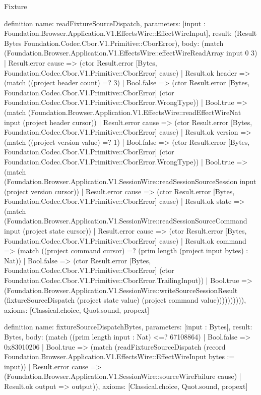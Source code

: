\begin{lexlean}{Fixture}
\begin{semanticmodule}
definition{
  name: readFixtureSourceDispatch,
  parameters: [input : Foundation.Browser.Application.V1.EffectsWire::EffectWireInput],
  result: (Result Bytes Foundation.Codec.Cbor.V1.Primitive::CborError),
  body: (match (Foundation.Browser.Application.V1.EffectsWire::effectWireReadArray input 0 3)
    | Result.error cause => (ctor Result.error [Bytes, Foundation.Codec.Cbor.V1.Primitive::CborError] cause)
    | Result.ok header => (match ((project header count) =? 3)
      | Bool.false => (ctor Result.error [Bytes, Foundation.Codec.Cbor.V1.Primitive::CborError] (ctor Foundation.Codec.Cbor.V1.Primitive::CborError.WrongType))
      | Bool.true => (match (Foundation.Browser.Application.V1.EffectsWire::readEffectWireNat input (project header cursor))
        | Result.error cause => (ctor Result.error [Bytes, Foundation.Codec.Cbor.V1.Primitive::CborError] cause)
        | Result.ok version => (match ((project version value) =? 1)
          | Bool.false => (ctor Result.error [Bytes, Foundation.Codec.Cbor.V1.Primitive::CborError] (ctor Foundation.Codec.Cbor.V1.Primitive::CborError.WrongType))
          | Bool.true => (match (Foundation.Browser.Application.V1.SessionWire::readSessionSourceSession input (project version cursor))
            | Result.error cause => (ctor Result.error [Bytes, Foundation.Codec.Cbor.V1.Primitive::CborError] cause)
            | Result.ok state => (match (Foundation.Browser.Application.V1.SessionWire::readSessionSourceCommand input (project state cursor))
              | Result.error cause => (ctor Result.error [Bytes, Foundation.Codec.Cbor.V1.Primitive::CborError] cause)
              | Result.ok command => (match ((project command cursor) =? (prim length (project input bytes) : Nat))
                | Bool.false => (ctor Result.error [Bytes, Foundation.Codec.Cbor.V1.Primitive::CborError] (ctor Foundation.Codec.Cbor.V1.Primitive::CborError.TrailingInput))
                | Bool.true => (Foundation.Browser.Application.V1.SessionWire::writeSourceSessionResult (fixtureSourceDispatch (project state value) (project command value)))))))))),
  axioms: [Classical.choice, Quot.sound, propext]
}

definition{
  name: fixtureSourceDispatchBytes,
  parameters: [input : Bytes],
  result: Bytes,
  body: (match ((prim length input : Nat) <=? 67108864)
    | Bool.false => 0x83010206
    | Bool.true => (match (readFixtureSourceDispatch (record Foundation.Browser.Application.V1.EffectsWire::EffectWireInput {bytes := input}))
      | Result.error cause => (Foundation.Browser.Application.V1.SessionWire::sourceWireFailure cause)
      | Result.ok output => output)),
  axioms: [Classical.choice, Quot.sound, propext]
}


\end{semanticmodule}
\end{lexlean}
